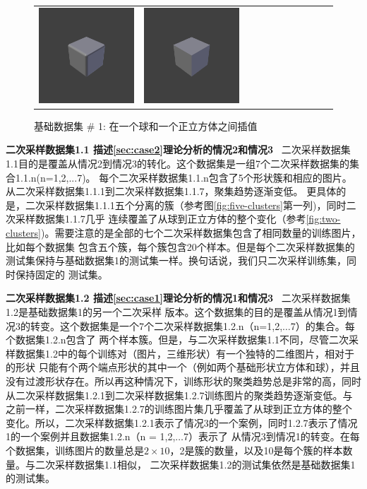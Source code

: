 \documentclass[bachelor, nocolorlinks, printoneside]{seuthesis} %
\begin{document}
\begin{Main}
\begin{figure}
\begin{tabular}{c@{}c@{}c@{}c@{}c@{}c@{}c@{}c@{}c@{}c@{}c@{}}
		\includegraphics[width=.09\textwidth,keepaspectratio]{figs/Isometric9.png} &
		\includegraphics[width=.09\textwidth,keepaspectratio]{figs/Isometric10.png} \\    	
	\end{tabular}
	\caption{\small 基础数据集 \# 1: 在一个球和一个正立方体之间插值}
    \label{fig:cube-sphere} \vspace{-4mm}
\end{figure}

\textbf{二次采样数据集1.1 描述\ref{sec:case2}理论分析的情况2和情况3} ~二次采样数据集1.1目的是覆盖从情况2到情况3的转化。这个数据集是一组7个二次采样数据集的集合1.1.n(n=1,2,...7)。
每个二次采样数据集1.1.n包含了5个形状簇和相应的图片。从二次采样数据集1.1.1到二次采样数据集1.1.7，聚集趋势逐渐变低。
更具体的是，二次采样数据集1.1.1五个分离的簇（参考图\ref{fig:five-clusters}第一列)，同时二次采样数据集1.1.7几乎
连续覆盖了从球到正立方体的整个变化（参考\ref{fig:two-clusters})。需要注意的是全部的七个二次采样数据集包含了相同数量的训练图片，比如每个数据集
包含五个簇，每个簇包含20个样本。但是每个二次采样数据集的测试集保持与基础数据集1的测试集一样。换句话说，我们只二次采样训练集，同时保持固定的
测试集。

\textbf{二次采样数据集1.2 描述\ref{sec:case1}理论分析的情况1和情况3} ~二次采样数据集1.2是基础数据集1的另一个二次采样
版本。这个数据集的目的是覆盖从情况1到情况3的转变。这个数据集是一个7个二次采样数据集1.2.n（n=1,2,$\ldots $7）的集合。每个数据集1.2.n包含了
两个样本簇。但是，与二次采样数据集1.1不同，尽管二次采样数据集1.2中的每个训练对（图片，三维形状）有一个独特的二维图片，相对于的形状
只能有个两个端点形状的其中一个（例如两个基础形状立方体和球），并且没有过渡形状存在。所以再这种情况下，训练形状的聚类趋势总是非常的高，同时
从二次采样数据集1.2.1到二次采样数据集1.2.7训练图片的聚类趋势逐渐变低。与之前一样，二次采样数据集1.2.7的训练图片集几乎覆盖了从球到正立方体的整个
变化。所以，二次采样数据集1.2.1表示了情况3的一个案例，同时1.2.7表示了情况1的一个案例并且数据集1.2.n（n = 1,2,$\ldots $7）表示了
从情况3到情况1的转变。在每个数据集，训练图片的数量总是$2\times10$，2是簇的数量，以及10是每个簇的样本数量。与二次采样数据集1.1相似，
二次采样数据集1.2的测试集依然是基础数据集1的测试集。


\end{Main}
\end{document}
